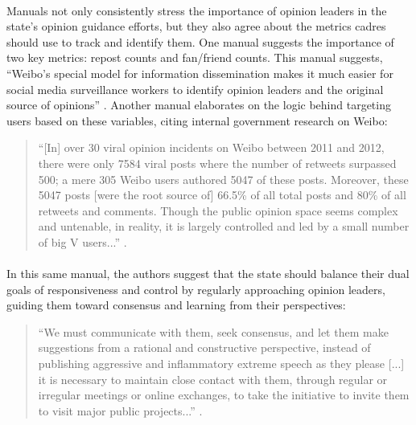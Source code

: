 \documentclass[12pt]{article}
\begin{document}
\begin{CJK*}{UTF8}{gbsn}
\paragraph{} Manuals not only consistently stress the importance of opinion leaders in the state's opinion guidance efforts, but they also agree about the metrics cadres should use to track and identify them. One manual suggests the importance of two key metrics: repost counts and fan/friend counts. This manual suggests, ``Weibo's special model for information dissemination makes it much easier for social media surveillance workers to identify opinion leaders and the original source of opinions'' \citep[201-228]{zhou2011weibo}. Another manual elaborates on the logic behind targeting users based on these variables, citing internal government research on Weibo:

\begin{quote}
``[In] over 30 viral opinion incidents on Weibo between 2011 and 2012, there were only 7584 viral posts where the number of retweets surpassed 500; a mere 305 Weibo users authored 5047 of these posts. Moreover, these 5047 posts [were the root source of] 66.5\% of all total posts and 80\% of all retweets and comments. Though the public opinion space seems complex and untenable, in reality, it is largely controlled and led by a small number of big V users...'' \citep[180-194]{zeng2015wangluo}.
\end{quote}

\paragraph{} In this same manual, the authors suggest that the state should balance their dual goals of responsiveness and control by regularly approaching opinion leaders, guiding them toward consensus and learning from their perspectives:

\begin{quote}
``We must communicate with them, seek consensus, and let them make suggestions from a rational and constructive perspective, instead of publishing aggressive and inflammatory extreme speech as they please [...] it is necessary to maintain close contact with them, through regular or irregular meetings or online exchanges, to take the initiative to invite them to visit major public projects...'' \citep[180-194]{zeng2015wangluo}. 
\end{quote}


\end{CJK*}
\end{document}
